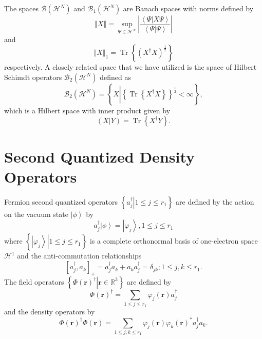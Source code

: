 \documentclass[aps,preprint]{revtex4}%
\begin{document}
The spaces $\mathcal{B}\left(  \mathcal{H}^{N}\right)  $ and $\mathcal{B}%
_{1}\left(  \mathcal{H}^{N}\right)  $ are Banach spaces with norms defined by
\begin{equation}
\left\Vert X\right\Vert =\sup_{\Psi\in\mathcal{H}^{N}}\left\vert
\frac{\left\langle \Psi\left\vert X\Psi\right.  \right\rangle }{\left\langle
\Psi\left\vert \Psi\right.  \right\rangle }\right\vert
\end{equation}
and
\begin{equation}
\left\Vert X\right\Vert _{1}=\operatorname{Tr}\left\{  \left(  X^{\dagger
}X\right)  ^{\frac{1}{2}}\right\}
\end{equation}
respectively. A closely related space that we have utilized is the space of
Hilbert Schimdt operators $\mathcal{B}_{2}\left(  \mathcal{H}^{N}\right)  $
defined as
\begin{equation}
\mathcal{B}_{2}\left(  \mathcal{H}^{N}\right)  =\left\{  X\left\vert \left\{
\operatorname{Tr}\left\{  X^{\dagger}X\right\}  \right\}  ^{\frac{1}{2}%
}<\infty\right.  \right\}  ,
\end{equation}
which is a Hilbert space with inner product given by
\begin{equation}
\left(  X\left\vert Y\right.  \right)  =\operatorname{Tr}\left\{  X^{\dagger
}Y\right\}  .
\end{equation}


\section{Second Quantized Density Operators \label{SecQuant}}

Fermion second quantized operators $\left\{  \left.  a_{j}^{\dagger
}\right\vert 1\leq j\leq r_{1}\right\}  $ are defined by the action on the
vacuum state $\left\vert \phi\right\rangle $ by
\begin{equation}
a_{j}^{\dagger}\left\vert \phi\right\rangle =\left\vert \varphi_{j}%
\right\rangle ,1\leq j\leq r_{1}%
\end{equation}
where $\left\{  \left.  \left\vert \varphi_{j}\right\rangle \right\vert 1\leq
j\leq r_{1}\right\}  $ is a complete orthonormal basis of one-electron space
$\mathcal{H}^{1}$ and the anti-commutation relationships
\begin{equation}
\left[  a_{j}^{\dagger},a_{k}\right]  _{+}=a_{j}^{\dagger}a_{k}+a_{k}%
a_{j}^{\dagger}=\delta_{jk};1\leq j,k\leq r_{1}.
\end{equation}
The field operators $\left\{  \left.  \Phi\left(  \boldsymbol{r}\right)
^{\dagger}\right\vert \boldsymbol{r\in}\mathbb{R}^{3}\right\}  $ are defined
by
\begin{equation}
\Phi\left(  \boldsymbol{r}\right)  ^{\dagger}=\sum_{1\leq j\leq r_{1}}%
\varphi_{j}\left(  \boldsymbol{r}\right)  a_{j}^{\dagger}%
\end{equation}
and the density operators by
\begin{equation}
\Phi\left(  \boldsymbol{r}\right)  ^{\dagger}\Phi\left(  \boldsymbol{r}%
\right)  =\sum_{1\leq j,k\leq r_{1}}\varphi_{j}\left(  \boldsymbol{r}\right)
\varphi_{k}\left(  \boldsymbol{r}\right)  ^{\ast}a_{j}^{\dagger}a_{k}.
\end{equation}
\end{document}
